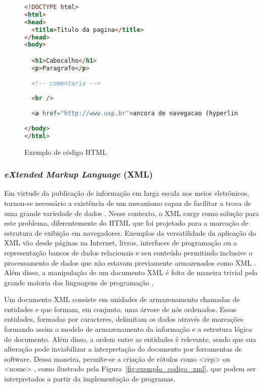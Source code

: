 \begin{figure}[!ht]
    \begin{lstlisting}[language=HTML,frame=trbl]
<!DOCTYPE html>
<html>
<head>
  <title>Titulo da pagina</title>
</head>
<body>

  <h1>Cabecalho</h1>
  <p>Paragrafo</p>
  
  <!-- comentario -->
  
  <br /> 
  
  <a href="http://www.usp.br">ancora de navegacao (hyperlink)</a>
  
</body>
</html>
    \end{lstlisting}
    \caption{Exemplo de código HTML}
    \label{fig:exemplo_codigo_html} 
\end{figure}

\subsubsection{\emph{eXtended Markup Language} (XML)}
\label{sec:xml}

Em virtude da publicação de informação em larga escala nos meios eletrônicos, tornou-se necessário a existência de um mecanismo capaz de facilitar a troca de uma grande variedade de dados \citep{W3C_XML}. Nesse contexto, o XML surge como solução para este problema, diferentemente do HTML que foi projetado para a marcação de estrutura de exibição em navegadores. Exemplos da versatilidade da aplicação do XML vão desde páginas na Internet, livros, interfaces de programação ou a representação bancos de dados relacionais e seu conteúdo permitindo inclusive o processamento de dados que não estavam previamente armazenados como XML \citep{Wang}. Além disso, a manipulação de um documento XML é feita de maneira trivial pela grande maioria das linguagens de programação \citep{Heath2008},
 
Um documento XML consiste em unidades de armazenamento chamadas de entidades e que formam, em conjunto, uma árvore de nós ordenados. Essas entidades, formadas por caracteres, delimitam os dados através de marcações formando assim o modelo de armazenamento da informação e a estrutura lógica do documento. Além disso, a ordem entre as entidades é relevante, sendo que sua alteração pode inviabilizar a interpretação do documento por ferramentas de software. Dessa maneira, permite-se a criação de rótulos como <cep> ou <nome> , como ilustrado pela Figura~\ref{fig:exemplo_codigo_xml}, que podem ser interpretados a partir da implementação de programas. 

